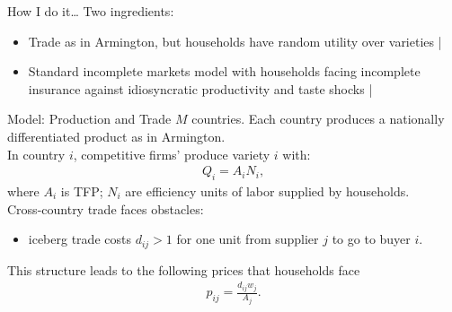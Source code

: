 \documentclass[9pt,pdftex,aspectratio=1610]{beamer}
\theoremstyle{definition}
\begin{document}
\begin{frame}[t]{How I do it\ldots}
Two ingredients:
\begin{itemize}
\smallskip
\item Trade as in Armington, but households have random utility over varieties | \citet{mcfadden1974frontiers}
\smallskip
\item Standard incomplete markets model with households facing incomplete insurance against idiosyncratic productivity and taste shocks | \citet{bewley1979optimum}
\end{itemize}
\bigskip
{}

\end{frame}


\begin{frame}[t]{Model: Production and Trade}
\smallskip
$M$ countries. Each country produces a nationally differentiated product as in Armington.\\
\bigskip
\medskip
In country $i$, competitive firms' produce variety $i$ with:
\begin{align*}
Q_i = A_i N_i,
\end{align*}
where $A_i$ is TFP; $N_i$ are efficiency units of labor supplied by households.\\
\bigskip
\medskip
Cross-country trade faces obstacles:
\begin{itemize}
\smallskip
\item iceberg trade costs $d_{ij} > 1$ for one unit from supplier $j$ to go to buyer $i$.
\end{itemize}
\bigskip
\medskip
This structure leads to the following prices that households face
\begin{align*}
p_{ij} = \frac{d_{ij}w_{j}}{A_{j}}.
\end{align*}
\end{frame}
\end{document}
